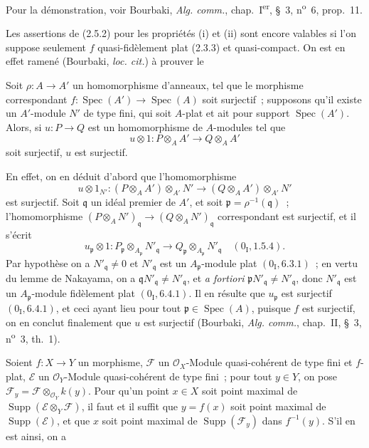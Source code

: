 Pour la démonstration, voir Bourbaki, \emph{Alg. comm.},
chap.~I\textsuperscript{er}, \S~3, n\textsuperscript{o}~6, prop.~11.

\begin{remark}[2.5.4]
\label{IV.2.5.4-fr}
Les assertions de (2.5.2) pour les propriétés (i) et (ii) sont encore
valables si l'on suppose seulement $f$ quasi-fidèlement plat (2.3.3) et
quasi-compact. On est en effet ramené (Bourbaki, \emph{loc. cit.}) à prouver
le
\end{remark}

\begin{lemma}[2.5.4.1]
\label{IV.2.5.4.1-fr}
Soit $\rho:A\to A'$ un homomorphisme d'anneaux, tel que le morphisme
correspondant $f:\operatorname{Spec}(A')\to\operatorname{Spec}(A)$ soit
surjectif~; supposons qu'il existe un $A'$-module $N'$ de type fini, qui soit
$A$-plat et ait pour support $\operatorname{Spec}(A')$. Alors, si
$u:P\to Q$ est un homomorphisme de $A$-modules tel que
\[
u\otimes 1:P\otimes_A A'\longrightarrow Q\otimes_A A'
\]
soit surjectif, $u$ est surjectif.
\end{lemma}

En effet, on en déduit d'abord que l'homomorphisme
\[
u\otimes 1_{N'}:(P\otimes_A A')\otimes_{A'}N'
\longrightarrow(Q\otimes_A A')\otimes_{A'}N'
\]
est surjectif. Soit $\mathfrak q$ un idéal premier de $A'$, et soit
$\mathfrak p=\rho^{-1}(\mathfrak q)$~; l'homomorphisme
$(P\otimes_A N')_{\mathfrak q}\to(Q\otimes_A N')_{\mathfrak q}$
correspondant est surjectif, et il s'écrit
\[
u_{\mathfrak p}\otimes 1:
P_{\mathfrak p}\otimes_{A_{\mathfrak p}}N'_{\mathfrak q}
\longrightarrow
Q_{\mathfrak p}\otimes_{A_{\mathfrak p}}N'_{\mathfrak q}
\quad(0_{\mathrm I},1.5.4).
\]
Par hypothèse on a $N'_{\mathfrak q}\ne0$ et $N'_{\mathfrak q}$ est un
$A_{\mathfrak p}$-module plat $(0_{\mathrm I},6.3.1)$~; en vertu du lemme de
Nakayama, on a
$\mathfrak qN'_{\mathfrak q}\ne N'_{\mathfrak q}$, et \emph{a fortiori}
$\mathfrak pN'_{\mathfrak q}\ne N'_{\mathfrak q}$, donc
$N'_{\mathfrak q}$ est un $A_{\mathfrak p}$-module fidèlement plat
$(0_{\mathrm I},6.4.1)$. Il en résulte que $u_{\mathfrak p}$ est surjectif
$(0_{\mathrm I},6.4.1)$, et ceci ayant lieu pour tout
$\mathfrak p\in\operatorname{Spec}(A)$, puisque $f$ est surjectif, on en
conclut finalement que $u$ est surjectif (Bourbaki, \emph{Alg. comm.},
chap.~II, \S~3, n\textsuperscript{o}~3, th.~1).

\begin{proposition}[2.5.5]
\label{IV.2.5.5-fr}
Soient $f:X\to Y$ un morphisme, $\mathscr F$ un $\mathcal O_X$-Module
quasi-cohérent de type fini et $f$-plat, $\mathscr E$ un
$\mathcal O_Y$-Module quasi-cohérent de type fini~; pour tout $y\in Y$, on
pose $\mathscr F_y=\mathscr F\otimes_{\mathcal O_Y}k(y)$. Pour qu'un point
$x\in X$ soit point maximal de
$\operatorname{Supp}(\mathscr E\otimes_Y\mathscr F)$, il faut et il suffit que
$y=f(x)$ soit point maximal de $\operatorname{Supp}(\mathscr E)$, et que $x$
soit point maximal de $\operatorname{Supp}(\mathscr F_y)$ dans $f^{-1}(y)$.
S'il en est ainsi, on a
\end{proposition}


